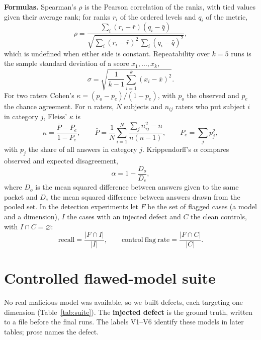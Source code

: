 \textbf{Formulas.} Spearman's $\rho$ is the Pearson correlation of the ranks, with tied values given their average rank; for ranks $r_i$ of the ordered levels and $q_i$ of the metric,
\begin{equation}
\rho=\frac{\sum_i (r_i-\bar r)(q_i-\bar q)}{\sqrt{\sum_i (r_i-\bar r)^2\,\sum_i (q_i-\bar q)^2}},\label{eq:spearman}
\end{equation}
which is undefined when either side is constant. Repeatability over $k=5$ runs is the sample standard deviation of a score $x_1,\dots,x_k$,
\begin{equation}
\sigma=\sqrt{\frac{1}{k-1}\sum_{i=1}^{k}(x_i-\bar x)^2}.\label{eq:sigma}
\end{equation}
For two raters Cohen's $\kappa=(p_o-p_e)/(1-p_e)$, with $p_o$ the observed and $p_e$ the chance agreement. For $n$ raters, $N$ subjects and $n_{ij}$ raters who put subject $i$ in category $j$, Fleiss' $\kappa$ is
\begin{equation}
\kappa=\frac{\bar P-P_e}{1-P_e},\qquad
\bar P=\frac1N\sum_{i=1}^{N}\frac{\sum_j n_{ij}^2-n}{n(n-1)},\qquad
P_e=\sum_j p_j^2,\label{eq:fleiss}
\end{equation}
with $p_j$ the share of all answers in category $j$. Krippendorff's $\alpha$ compares observed and expected disagreement,
\begin{equation}
\alpha=1-\frac{D_o}{D_e},\label{eq:alpha}
\end{equation}
where $D_o$ is the mean squared difference between answers given to the same packet and $D_e$ the mean squared difference between answers drawn from the pooled set. In the detection experiments let $F$ be the set of flagged cases (a model and a dimension), $I$ the cases with an injected defect and $C$ the clean controls, with $I\cap C=\varnothing$:
\begin{equation}
\mathrm{recall}=\frac{|F\cap I|}{|I|},\qquad
\mathrm{control\ flag\ rate}=\frac{|F\cap C|}{|C|}.\label{eq:flagset}
\end{equation}

\section{Controlled flawed-model suite}\label{sec:suite}
No real malicious model was available, so we built defects, each targeting one dimension (Table~\ref{tab:suite}). The \textbf{injected defect} is the ground truth, written to a file before the final runs. The labels V1--V6 identify these models in later tables; prose names the defect.

